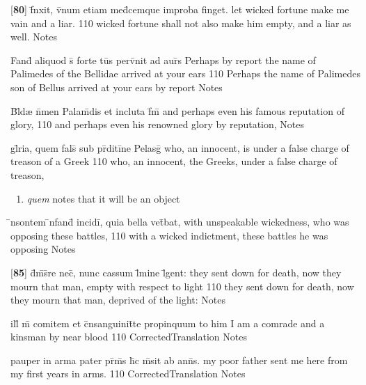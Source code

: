 \latline
  {[\textbf{80}] f\={\macron {\i}}nxit, v\={}num etiam med\={}cemque improba finget.}
  { let wicked fortune make me vain and a liar. }
  {110}
  { wicked fortune shall not also make him empty, and a liar as well. }
  { Notes }


\latline
  {Fand\={} aliquod s\={\macron {\i}} forte tu\={}s perv\={}nit ad aur\={\macron {\i}}s}
  { Perhaps by report the name of Palimedes of the Bellidae arrived at your ears }
  {110}
  { Perhaps the name of Palimedes son of Bellus arrived at your ears by report }
  { Notes }


\latline
  {B\={}l\={\macron {\i}}d{\ae} n\={}men Palam\={}dis et incluta f\={}m\={}}
  { and perhaps even his famous reputation of glory, }
  {110}
  { and perhaps even his renowned glory by reputation, }
  { Notes }


\latline
  {gl\={}ria, quem fals\={} sub pr\={}diti\={}ne Pelasg\={\macron {\i}}}
  { who, an innocent, is under a false charge of treason of a Greek }
  {110}
  { who, an innocent, the Greeks, under a false charge of treason, }
  { \begin{enumerate}
  	\item \emph{quem} notes that it will be an object
  \end{enumerate} }


\latline
  {\={\macron {\i}}nsontem \={\macron {\i}}nfand\={} incidi\={}, quia bella vet\={}bat,}
  { with unspeakable wickedness, who was opposing these battles, }
  {110}
  { with a wicked indictment, these battles he was opposing }
  { Notes }


\latline
  {[\textbf{85}] d\={}m\={\macron {\i}}s\={}re nec\={\macron {\i}}, nunc cassum l\={}mine l\={}gent:}
  { they sent down for death, now they mourn that man, empty with respect to light }
  {110}
  { they sent down for death, now they mourn that man, deprived of the light: }
  { Notes }


\latline
  {ill\={\macron {\i}} m\={} comitem et c\={}nsanguinit\={}te propinquum}
  { to him I am a comrade and a kinsman by near blood }
  {110}
  { CorrectedTranslation }
  { Notes }


\latline
  {pauper in arma pater pr\={\macron {\i}}m\={\macron {\i}}s h\={}c m\={\macron {\i}}sit ab ann\={\macron {\i}}s.}
  { my poor father sent me here from my first years in arms. }
  {110}
  { CorrectedTranslation }
  { Notes }


